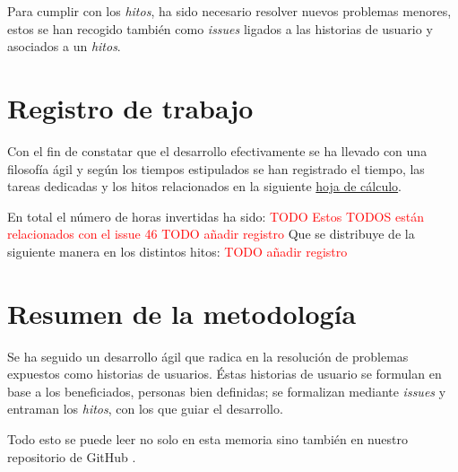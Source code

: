 Para cumplir con los \textit{hitos},  ha sido necesario resolver nuevos  problemas menores, estos se han
recogido también como \textit{issues} ligados a las historias de usuario y asociados a un  \textit{hitos}.

\section{Registro de trabajo}  

Con el fin de constatar que el desarrollo efectivamente se ha 
llevado con una filosofía ágil y según los tiempos estipulados se han registrado el tiempo,
 las tareas dedicadas  y los hitos relacionados
en la siguiente \href{https://docs.google.com/spreadsheets/d/1TCcKQIKjKW9sMSU2f6obN9gHgv3c8UEdjmONkBlv42M/edit?usp=sharing}{hoja de cálculo}.

En total el número de horas invertidas ha sido: 
\textcolor{red}{TODO Estos TODOS están relacionados con el issue 46}
\textcolor{red}{TODO añadir registro}
Que se distribuye de la siguiente manera en los distintos hitos: 
\textcolor{red}{TODO añadir registro}


\section{Resumen de la metodología}  

Se ha seguido un desarrollo ágil que radica en la resolución de problemas expuestos como historias de usuarios. 
Éstas historias de usuario se formulan en base a los beneficiados, personas bien definidas; se formalizan 
mediante \textit{issues} y entraman los \textit{hitos}, con los que guiar el desarrollo.

Todo esto se puede leer no solo en esta memoria sino también en nuestro repositorio de GitHub \cite{TFG-Estudio-de-las-redes-neuronales}. 
 




